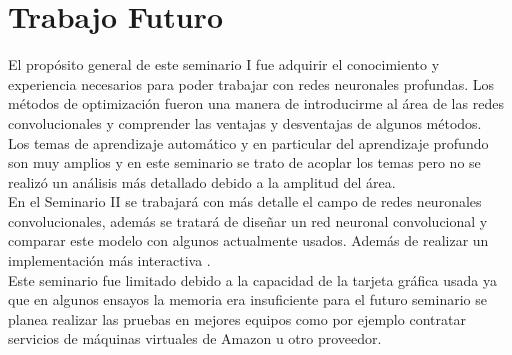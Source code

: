 \section{Trabajo Futuro}
El propósito general de este seminario I fue adquirir el conocimiento y experiencia necesarios para poder trabajar con redes neuronales profundas. Los métodos de optimización fueron una manera de introducirme al área de las redes convolucionales y comprender las ventajas y desventajas de algunos métodos. \\
Los temas de aprendizaje automático y en particular del aprendizaje profundo son muy amplios y en este seminario se trato de acoplar los temas pero no se realizó un análisis más detallado debido a la amplitud del área. \\
En el Seminario II se trabajará con más detalle el campo de redes neuronales convolucionales, además se tratará de diseñar un red neuronal convolucional y comparar este modelo con algunos actualmente usados. Además de realizar un implementación más interactiva .\\ Este seminario fue limitado debido a la capacidad de la tarjeta gráfica usada ya que en algunos ensayos la memoria era insuficiente para el futuro seminario se planea realizar las pruebas en mejores equipos como por ejemplo contratar servicios de máquinas virtuales de Amazon u otro proveedor.



